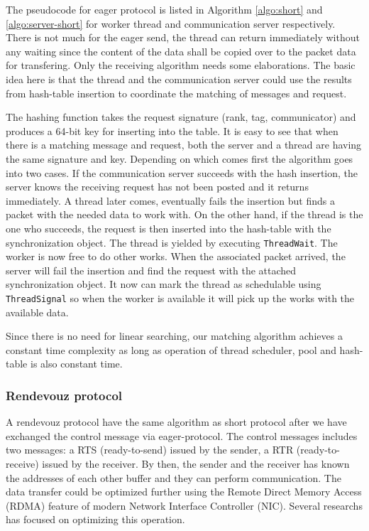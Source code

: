The pseudocode for eager protocol is listed in Algorithm \ref{algo:short} and
\ref{algo:server-short} for worker thread and communication server
respectively. There is not much for the eager send, the thread can return
immediately without any waiting since the content of the data shall be copied
over to the packet data for transfering. Only the receiving algorithm needs some
elaborations. The basic idea here is that the thread and the communication
server could use the results from hash-table insertion to coordinate the
matching of messages and request.

The hashing function takes the request signature (rank, tag, communicator) and
produces a 64-bit key for inserting into the table. It is easy to see that
when there is a matching message and request, both the server and a thread 
are having the same signature and key. Depending on which comes first the algorithm
goes into two cases. If the communication server succeeds with the hash
insertion, the server knows the receiving request has not been posted and it
returns immediately. A thread later comes, eventually fails the insertion but
finds a packet with the needed data to work with. On the other hand, if the
thread is the one who succeeds, the request is then inserted into the
hash-table with the synchronization object.  The thread is yielded by executing
\texttt{ThreadWait}. The worker is now free to do other works. When the
associated packet arrived, the server will fail the insertion and find the
request with the attached synchronization object. It now can mark the thread as
schedulable using \texttt{ThreadSignal} so when the worker is available it will
pick up the works with the available data.

Since there is no need for linear searching, our matching algorithm achieves a
constant time complexity as long as operation of thread scheduler, pool and
hash-table is also constant time.

\subsubsection{Rendevouz protocol}
A rendevouz protocol have the same algorithm as short protocol after we have
exchanged the control message via eager-protocol. The control messages 
includes two messages: a RTS (ready-to-send) issued by the sender, a RTR
(ready-to-receive) issued by the receiver. By then, the sender and the receiver
has known the addresses of each other buffer and they can perform
communication.  The data transfer could be optimized further using the
Remote Direct Memory Access (RDMA) feature of modern Network Interface
Controller (NIC).  Several researchs has focused on optimizing this operation.

